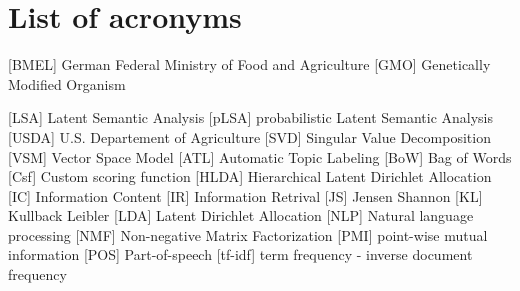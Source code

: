 \section*{List of acronyms}
\begin{acronym}
	\setlength{\parskip}{0ex}
	\setlength{\itemsep}{1ex}
	 [BMEL] {German Federal Ministry of Food and Agriculture}
	 [GMO] {Genetically Modified Organism}
	
		[LSA] {Latent Semantic Analysis}
	 [pLSA] {probabilistic Latent Semantic Analysis}
	 [USDA] {U.S. Departement of Agriculture}
	 [SVD] {Singular Value Decomposition}
	 [VSM] {Vector Space Model}	
	 [ATL] {Automatic Topic Labeling}
	 [BoW] {Bag of Words}
	 [Csf] {Custom scoring function}
	[HLDA] {Hierarchical Latent Dirichlet Allocation}
	 [IC] {Information Content}
		[IR] {Information Retrival}
	 [JS] {Jensen Shannon}
		[KL] {Kullback Leibler}
		[LDA] {Latent Dirichlet Allocation}
	 [NLP] {Natural language processing}
	 	[NMF] {Non-negative Matrix Factorization}
	 [PMI] {point-wise mutual information}
	 [POS] {Part-of-speech}
	 [tf-idf] {term frequency - inverse document frequency}
	
\end{acronym}